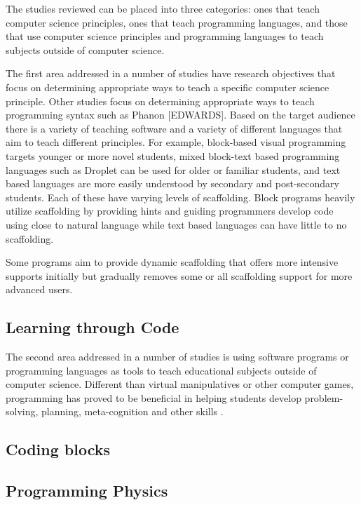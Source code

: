\documentclass[12pt]{extarticle}
\begin{document}
The studies reviewed can be placed into three categories: ones that teach computer science principles, ones that teach programming languages, and those that use computer science principles and programming languages to teach subjects outside of computer science.

The first area addressed in a number of studies have research objectives that focus on determining appropriate ways to teach a specific computer science principle.
Other studies focus on determining appropriate ways to teach programming syntax such as Phanon [EDWARDS].
Based on the target audience there is a variety of teaching software and a variety of different languages that aim to teach different principles.
For example, block-based visual programming targets younger or more novel students, mixed block-text based programming languages such as Droplet can be used for older or familiar students, and text based languages are more easily understood by secondary and post-secondary students.
Each of these have varying levels of scaffolding.
Block programs heavily utilize scaffolding by providing hints and guiding programmers develop code using close to natural language while text based languages can have little to no scaffolding.

Some programs aim to provide dynamic scaffolding that offers more intensive supports initially but gradually removes some or all scaffolding support for more advanced users.
    
\subsection*{Learning through Code}
The second area addressed in a number of studies is using software programs or programming languages as tools to teach educational subjects outside of computer science.
Different than virtual manipulatives or other computer games, programming has proved to be beneficial in helping students develop problem-solving, planning, meta-cognition and other skills \cite{scratchjr, specialEducation}.

\subsection{Coding blocks}\cite{}
\subsection{Programming Physics}\cite{sherin}
\end{document}
